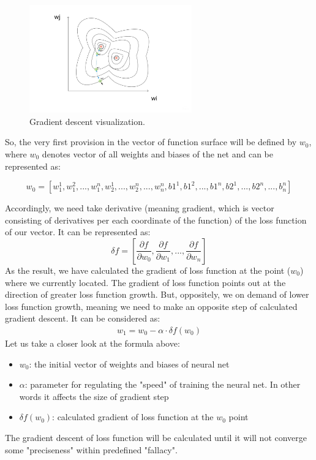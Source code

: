 \documentclass{article}
\begin{document}
\begin{figure}[h]
    \centering \includegraphics[width=7cm]{images/gradient_descent.jpg}
    \caption {Gradient descent visualization.}
\end{figure}

So, the very first provision in the vector of function surface will be defined by $w_0$, where $w_0$ denotes vector of all weights and biases of the net and can be represented as: 

\[ w_0 = [w_1^1, w_1^2,...,w_1^n, w_2^1,...,w_2^n,...,w_n^n, b1^1, b1^2,...,b1^n, b2^1,...,b2^n,...,b_n^n] \]

Accordingly, we need take derivative (meaning gradient, which is vector consisting of derivatives per each coordinate of the function) of the loss function of our vector. It can be represented as:
\[ \delta{f} = [\frac{\partial{f}}{\partial{w_0}}, \frac{\partial{f}}{\partial{w_1}}, ... ,\frac{\partial{f}}{\partial{w_n}} ] \]
As the result, we have calculated the gradient of loss function at the point ($w_0$) where we currently located. The gradient of loss function points out at the direction of greater loss function growth. But, oppositely, we on demand of lower loss function growth, meaning we need to make an opposite step of calculated gradient descent. It can be considered as:
\begin{align*}
w_1 = w_0 - \alpha \cdot \delta{f(w_0)}
\end{align*}
Let us take a closer look at the formula above:
\begin{itemize}
    \item $w_0$: the initial vector of weights and biases of neural net
    \item $\alpha$: parameter for regulating the "speed" of training the neural net. In other words it affects the size of gradient step 
    \item $\delta{f(w_0)}$: calculated gradient of loss function at the $w_0$ point 
\end{itemize}
The gradient descent of loss function will be calculated until it will not converge some "preciseness" within predefined "fallacy".
\end{document}
